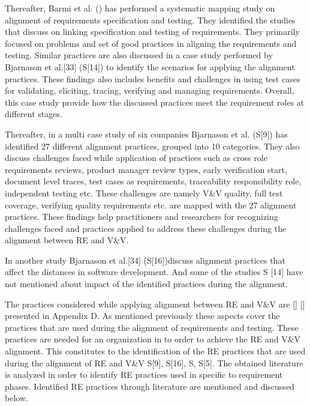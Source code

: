 \documentclass{article}
\begin{document}
Thereafter, Barmi et al. (\cite{barmi2011alignment}) has performed a systematic mapping study on alignment of requirements specification and testing. They identified the studies that discuss on linking specification and testing of requirements. They primarily focused on problems and set of good practices in aligning the requirements and testing. Similar practices are also discussed in a case study performed by Bjarnason et al.[33] (S[14]) to identify the scenarios for applying the alignment practices. These findings also includes benefits and challenges in using test cases for validating, eliciting, tracing, verifying and managing requirements. Overall, this case study provide how the discussed practices meet the requirement roles at different stages.

Thereafter, in a multi case study of six companies Bjarnason et al. \cite{bjarnason2014challenges} (S[9]) has identified 27 different alignment practices, grouped into 10 categories. They also discuss challenges faced while application of practices such as cross role requirements reviews, product manager review types, early verification start, document level traces, test cases as requirements, traceability responsibility role, independent testing etc. These challenges are namely V\&V quality, full test coverage, verifying quality requirements etc. are mapped with the 27 alignment practices. These findings help practitioners and researchers for recognizing challenges faced and practices applied to address these challenges during the alignment between RE and V\&V.  

In another study Bjarnason et al.[34] (S[16])discuss alignment practices that affect the distances in software development. And some of the studies S [14] have not mentioned about impact of the identified practices during the alignment.

The practices considered while applying alignment between RE and V\&V are \cite{barmi2011alignment} \cite{kukkanen2009applying} \cite{uusitalo2008linking} \cite{bjarnason2014challenges} [\cite{bjarnason2015industrial}] [\cite{bjarnason2014alignment}] presented in Appendix D. As mentioned previously these aspects cover the practices that are used during the alignment of requirements and testing. These practices are needed for an organization in to order to achieve the RE and V\&V alignment. This constitutes to the identification of the RE practices that are used during the alignment of RE and V\&V S[9], S[16], S\cite{bjarnason2014challenges}, S[5]. The obtained literature is analyzed in order to identify RE practices used in specific to requirement phases. Identified RE practices through literature are mentioned and discussed below.
\end{document}
